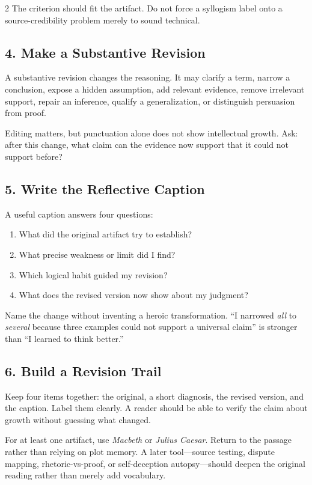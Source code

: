 \documentclass[12pt]{article}
\begin{document}
\begin{multicols}{2}
The criterion should fit the artifact. Do not force a syllogism label onto a source-credibility problem merely to sound technical.

\subsection*{4. Make a Substantive Revision}
A substantive revision changes the reasoning. It may clarify a term, narrow a conclusion, expose a hidden assumption, add relevant evidence, remove irrelevant support, repair an inference, qualify a generalization, or distinguish persuasion from proof.

Editing matters, but punctuation alone does not show intellectual growth. Ask: after this change, what claim can the evidence now support that it could not support before?

\subsection*{5. Write the Reflective Caption}
A useful caption answers four questions:

\begin{enumerate}[leftmargin=*,itemsep=0.12em]
\item What did the original artifact try to establish?
\item What precise weakness or limit did I find?
\item Which logical habit guided my revision?
\item What does the revised version now show about my judgment?
\end{enumerate}

Name the change without inventing a heroic transformation. ``I narrowed \textit{all} to \textit{several} because three examples could not support a universal claim'' is stronger than ``I learned to think better.''

\subsection*{6. Build a Revision Trail}
Keep four items together: the original, a short diagnosis, the revised version, and the caption. Label them clearly. A reader should be able to verify the claim about growth without guessing what changed.

For at least one artifact, use \textit{Macbeth} or \textit{Julius Caesar}. Return to the passage rather than relying on plot memory. A later tool---source testing, dispute mapping, rhetoric-vs-proof, or self-deception autopsy---should deepen the original reading rather than merely add vocabulary.


\end{multicols}
\end{document}
